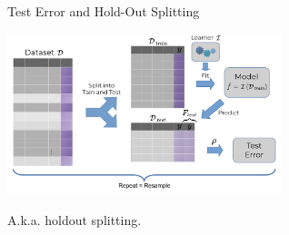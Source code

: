 \documentclass[11pt,compress,t,notes=noshow, xcolor=table]{beamer}
\begin{document}
\begin{vbframe}{Test Error and Hold-Out Splitting}
\begin{center}

  \includegraphics[width=0.6\textwidth]{figure_man/test_error.pdf}

\end{center}
A.k.a. holdout splitting.

\end{vbframe}


% 
% 

\end{document}
